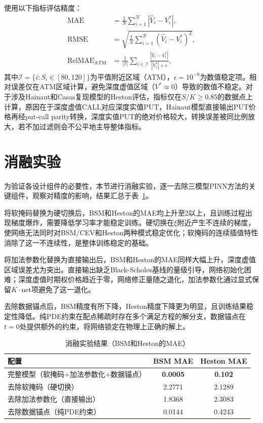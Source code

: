 使用以下指标评估精度：
\begin{align}
  \text{MAE} &= \frac{1}{N}\sum_{i=1}^N |\hat{V}_i - V_i^*|, \\
  \text{RMSE} &= \sqrt{\frac{1}{N}\sum_{i=1}^N (\hat{V}_i - V_i^*)^2}, \\
  \text{RelMAE}_\text{ATM} &= \frac{1}{|\mathcal{I}|}\sum_{i\in\mathcal{I}} \frac{|\hat{V}_i - V_i^*|}{|V_i^*|+\epsilon},
\end{align}
其中$\mathcal{I}=\{i: S_i\in[80,120]\}$为平值附近区域（ATM），$\epsilon=10^{-8}$为数值稳定项。相对误差仅在ATM区域计算，避免深度虚值区域（$V^*\approx 0$）导致的数值不稳定。对于涉及Hainaut和Casas\cite{hainaut2024heston}复现模型的Heston评估，指标仅在$S/K\geq 0.85$的数据点上计算，原因在于深度虚值CALL对应深度实值PUT，Hainaut模型直接输出PUT价格再经put-call parity转换，深度实值PUT的绝对价格较大，转换误差被同比例放大，若不加过滤则会不公平地主导整体指标。

\section{消融实验}\label{sec:ablation}

为验证各设计组件的必要性，本节进行消融实验，逐一去除三模型PINN方法的关键组件，观察对精度的影响，结果汇总于表~\ref{tab:ablation}。

将软掩码替换为硬切换后，BSM和Heston的MAE均上升至2以上，且训练过程出现梯度爆炸，需要降低学习率才能稳定训练。硬切换在$\xi$附近产生不连续的梯度，使网络无法同时对BSM/CEV和Heston两种模式稳定优化；软掩码的连续插值特性消除了这一不连续性，是整体训练稳定的基础。

将加法参数化替换为直接输出后，BSM和Heston的MAE同样大幅上升，深度虚值区域误差尤为突出。直接输出缺乏Black-Scholes基线的量级引导，网络初始化困难；深度虚值时期权价格趋近于零，网络修正量随之退化，加法参数化通过显式保留$K\cdot\text{net}$项避免了这一退化。

去除数据锚点后，BSM精度有所下降，Heston精度下降更为明显，且训练结果稳定性降低。纯PDE约束在配点稀疏时存在多个满足方程的解分支，数据锚点在$t=0$处提供额外的约束，将网络锁定在物理上正确的解上。

\begin{table}[htbp]
  \centering
  \caption{消融实验结果（BSM和Heston的MAE）}
  \label{tab:ablation}
  \begin{tabular}{lcc}
    \hline
    配置 & BSM MAE & Heston MAE \\
    \hline
    完整模型（软掩码+加法参数化+数据锚点） & \textbf{0.0005} & \textbf{0.102} \\
    去除软掩码（硬切换） & 2.2771 & 2.1289 \\
    去除加法参数化（直接输出） & 1.8368 & 2.3083 \\
    去除数据锚点（纯PDE约束） & 0.0144 & 0.4243 \\
    \hline
  \end{tabular}
\end{table}

